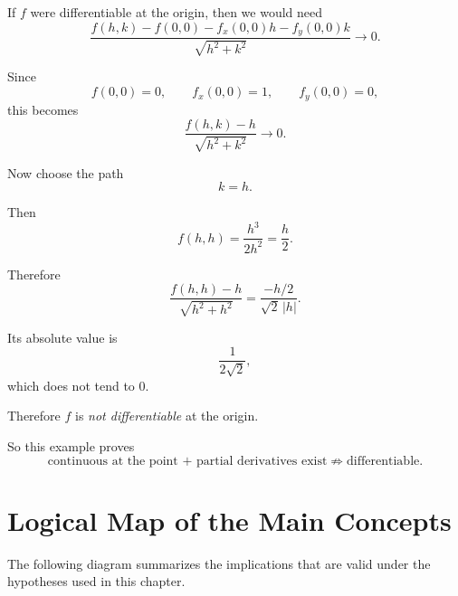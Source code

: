 \documentclass[11pt,oneside]{book}
\theoremstyle{studentthm}
\theoremstyle{definition}
\begin{document}
If \(f\) were differentiable at the origin, then we would need
\[
\frac{
f(h,k)-f(0,0)-f_x(0,0)h-f_y(0,0)k
}{
\sqrt{h^2+k^2}
}
\longrightarrow0.
\]

Since
\[
f(0,0)=0,\qquad
f_x(0,0)=1,\qquad
f_y(0,0)=0,
\]
this becomes
\[
\frac{
f(h,k)-h
}{
\sqrt{h^2+k^2}}
\longrightarrow0.
\]

Now choose the path
\[
k=h.
\]

Then
\[
f(h,h)
=
\frac{h^3}{2h^2}
=
\frac h2.
\]

Therefore
\[
\frac{
f(h,h)-h
}{
\sqrt{h^2+h^2}}
=
\frac{-h/2}{\sqrt2\,|h|}.
\]

Its absolute value is
\[
\frac{1}{2\sqrt2},
\]
which does not tend to \(0\).

Therefore \(f\) is \emph{not differentiable} at the origin.

So this example proves
\[
\text{continuous at the point + partial derivatives exist}
\not\Longrightarrow
\text{differentiable}.
\]

\section{Logical Map of the Main Concepts}

The following diagram summarizes the implications that are valid under
the hypotheses used in this chapter.

\begin{center}
\end{center}
\end{document}

